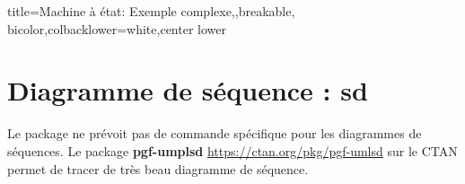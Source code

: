 \documentclass[a4paper,11pt]{article}                      %
\begin{document}
\begin{tcblisting}{title={Machine à état: Exemple complexe},,breakable, bicolor,colbacklower=white,center lower}
\newcommand{\cycleporte}{
\begin{tikzpicture}[remember picture,StmBlocPart=1]
\sysmlStmStart{0,0}{initporte}
\node[StmBloc,right=6em of initporte](fermee){Porte\\ fermée};
\node[StmBloc,right=6em of fermee](ouverte){Porte\\ ouverte};

\draw[lien] (initporte) to (fermee);
\draw[lien] (fermee) to [bend left=10]node{porte\_ouverte} (ouverte);
\draw[lien](ouverte) to [bend left=10]node[below]{porte\_fermée)}  (fermee);
\end{tikzpicture}
}

\end{tcblisting}


\section{Diagramme de séquence : sd}

Le package ne prévoit pas de commande spécifique pour les diagrammes de séquences. Le package \textbf{pgf-umplsd} \href{https://ctan.org/pkg/pgf-umlsd}{https://ctan.org/pkg/pgf-umlsd}  sur le CTAN  permet de tracer de très beau diagramme de séquence.
\end{document}
